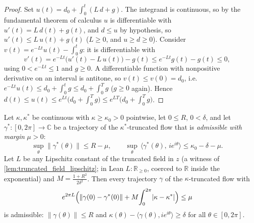 \begin{proof}

\leanok
  Set $u(t)=d_0+\int_0^t(L\,d+g)$. The integrand is continuous, so by the fundamental
  theorem of calculus $u$ is differentiable with $u'(t)=L\,d(t)+g(t)$, and $d\le u$ by
  hypothesis, so $u'(t)\le L\,u(t)+g(t)$ ($L\ge0$, and $u\ge d\ge0$). Consider
  $v(t)=e^{-Lt}u(t)-\int_0^t g$: it is differentiable with
  \[
    v'(t)=e^{-Lt}\bigl(u'(t)-L\,u(t)\bigr)-g(t)\le e^{-Lt}g(t)-g(t)\le0,
  \]
  using $0<e^{-Lt}\le1$ and $g\ge0$. A differentiable function with nonpositive
  derivative on an interval is antitone, so $v(t)\le v(0)=d_0$, i.e.
  $e^{-Lt}u(t)\le d_0+\int_0^t g\le d_0+\int_0^T g$ ($g\ge0$ again). Hence
  $d(t)\le u(t)\le e^{Lt}\bigl(d_0+\int_0^T g\bigr)\le e^{LT}\bigl(d_0+\int_0^T g\bigr)$.
\end{proof}

\begin{lemma}

  \label{lem:invariant_admissible_domain}
  Let $\kappa,\kappa^\ast$ be continuous with $\kappa\ge\kappa_0>0$ pointwise, let
  $0\le R$, $0<\delta$, and let $\gamma^\ast:[0,2\pi]\to\mathbb C$ be a trajectory of the
  $\kappa^\ast$-truncated flow that is \emph{admissible with margin} $\mu>0$:
  \[
    \sup_\theta\|\gamma^\ast(\theta)\|\le R-\mu,
    \qquad
    \sup_\theta\,\langle \gamma^\ast(\theta),\,i e^{i\theta}\rangle\le\kappa_0-\delta-\mu .
  \]
  Let $L$ be any Lipschitz constant of the truncated field in $z$ (a witness of
  \cref{lem:truncated_field_lipschitz}; in Lean $L:\mathbb R_{\ge0}$, coerced to
  $\mathbb R$ inside the exponential) and
  $M=\tfrac{1+R^2}{2\delta^2}$. Then every trajectory $\gamma$ of the $\kappa$-truncated flow
  with
  \[
    e^{2\pi L}\Bigl(\|\gamma(0)-\gamma^\ast(0)\|+M\!\int_0^{2\pi}\!|\kappa-\kappa^\ast|\Bigr)\le\mu
  \]
  is admissible: $\|\gamma(\theta)\|\le R$ and
  $\kappa(\theta)-\langle \gamma(\theta),i e^{i\theta}\rangle\ge\delta$ for all
  $\theta\in[0,2\pi]$.
\end{lemma}

